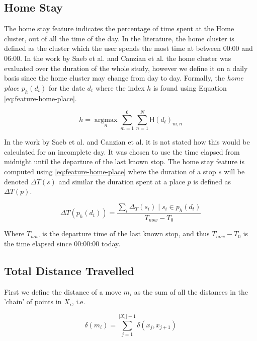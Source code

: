 \subsection{Home Stay}
The home stay feature indicates the percentage of time spent at the Home cluster, out of all the time of the day. In the literature, the home cluster is defined as the cluster which the user spends the most time at between 00:00 and 06:00. In the work by Saeb et al. and Canzian et al. \cite{Saeb2015, saeb2016, Canzian2015} the home cluster was evaluated over the duration of the whole study, however we define it on a daily basis since the home cluster may change from day to day. Formally, the \textit{home place} $p_h (d_t)$ for the date $d_t$ where the index $h$ is found using Equation \eqref{eq:feature-home-place}.

\begin{equation}
\label{eq:feature-home-place}
h = \operatorname*{argmax}_n \sum_{m=1}^{6} \sum_{n=1}^{N}  \mathsf{H}(d_t)_{m,n}
\end{equation}

In the work by Saeb et al. \cite{Saeb2015} and Canzian et al.\cite{Canzian2015} it is not stated how this would be calculated for an incomplete day. It was chosen to  use the time elapsed from midnight until the departure of the last known stop. The home stay feature is computed using \eqref{eq:feature-home-place} where the duration of a stop $s$ will be denoted $\Delta T (s)$ and similar the duration spent at a place $p$ is defined as $\Delta T (p)$.

\begin{equation}
\label{eq:feature-home-place}
\Delta T(p_{h} (d_t) )= \frac{\sum_i \Delta_T (s_i) \;|\; s_i \in p_h (d_t)}{T_{now} - T_{0}}
\end{equation}

Where $T_{now}$ is the departure time of the last known stop, and thus $T_{now} - T_0$ is the time elapsed since 00:00:00 today.

\subsection{Total Distance Travelled}
First we define the distance of a move $m_i$ as the sum of all the distances in the 'chain' of points in $X_i$, i.e.

\begin{equation}
\label{eq:feature-move-computation}
\delta (m_i)  = \sum_{j=1}^{|X_i|-1} \delta (x_j, x_{j+1})
\end{equation}

